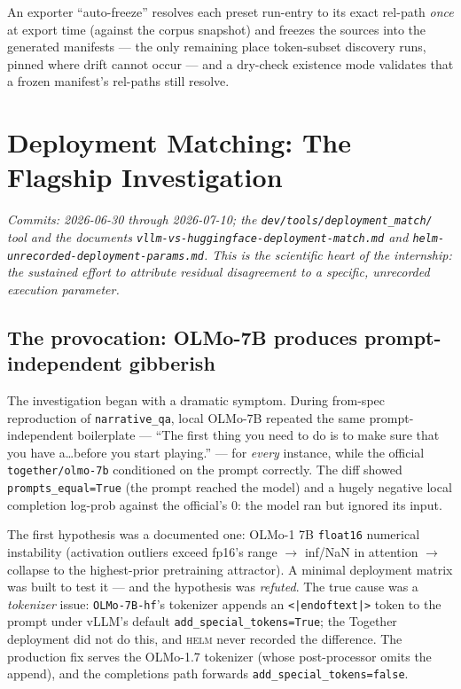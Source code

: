 \documentclass[11pt]{report}
\newcommand{\code}[1]{\texttt{#1}}
\newcommand{\file}[1]{\texttt{#1}}
\begin{document}
An exporter ``auto-freeze'' resolves each preset run-entry to its exact rel-path
\emph{once} at export time (against the corpus snapshot) and freezes the sources
into the generated manifests --- the only remaining place token-subset discovery
runs, pinned where drift cannot occur --- and a dry-check existence mode validates
that a frozen manifest's rel-paths still resolve.

\chapter{Deployment Matching: The Flagship Investigation}
\label{chap:deploymatch}

\emph{Commits: 2026-06-30 through 2026-07-10; the \code{dev/tools/deployment\_match/}
tool and the documents \file{vllm-vs-huggingface-deployment-match.md} and
\file{helm-unrecorded-deployment-params.md}. This is the scientific heart of the
internship: the sustained effort to attribute residual disagreement to a specific,
unrecorded execution parameter.}

\section{The provocation: OLMo-7B produces prompt-independent gibberish}
\label{sec:eosappend}

The investigation began with a dramatic symptom. During from-spec reproduction of
\code{narrative\_qa}, local OLMo-7B repeated the same prompt-independent
boilerplate --- ``The first thing you need to do is to make sure that you have
a\ldots before you start playing.'' --- for \emph{every} instance, while the
official \code{together/olmo-7b} conditioned on the prompt correctly. The diff
showed \code{prompts\_equal=True} (the prompt reached the model) and a hugely
negative local completion log-prob against the official's $0$: the model ran but
ignored its input.

The first hypothesis was a documented one: OLMo-1 7B \code{float16} numerical
instability (activation outliers exceed fp16's range $\rightarrow$ inf/NaN in
attention $\rightarrow$ collapse to the highest-prior pretraining attractor). A
minimal deployment matrix was built to test it --- and the hypothesis was
\emph{refuted}. The true cause was a \emph{tokenizer} issue: \code{OLMo-7B-hf}'s
tokenizer appends an \code{<|endoftext|>} token to the prompt under vLLM's default
\code{add\_special\_tokens=True}; the Together deployment did not do this, and
\textsc{helm} never recorded the difference. The production fix serves the
OLMo-1.7 tokenizer (whose post-processor omits the append), and the completions
path forwards \code{add\_special\_tokens=false}.
\end{document}

